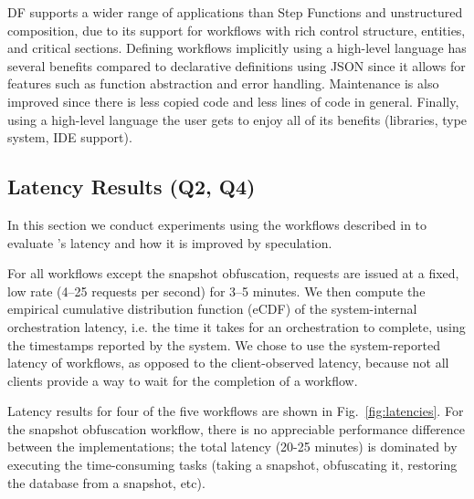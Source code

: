 %
DF supports a wider range of applications than Step Functions and unstructured composition, due to its support for workflows with rich control structure, entities, and critical sections. Defining workflows implicitly using a high-level language has several benefits compared to declarative definitions using JSON since it allows for features such as function abstraction and error handling. Maintenance is also improved since there is less copied code and less lines of code in general. Finally, using a high-level language the user gets to enjoy all of its benefits (libraries, type system, IDE support).

\subsection{Latency Results (Q2, Q4)}
\label{ssec:eval-latency}

In this section we conduct experiments using the workflows described in  to evaluate \sys's latency and how it is improved by speculation.

For all workflows except the snapshot obfuscation, requests are issued at a fixed, low rate (4--25 requests per second) for 3--5 minutes. We then compute the empirical cumulative distribution function (eCDF) of the  system-internal orchestration latency, i.e. the time it takes for an orchestration to complete, using the timestamps reported by the system. We chose to use the system-reported latency of workflows, as opposed to the client-observed latency, because not all clients provide a way to wait for the completion of a workflow.
%
\hide{
}

Latency results for four of the five workflows are shown in Fig.~\ref{fig:latencies}. For the snapshot obfuscation workflow, there is no appreciable performance difference between the implementations; the total latency (20-25 minutes) is dominated by executing the time-consuming tasks (taking a snapshot, obfuscating it, restoring the database from a snapshot, etc).

